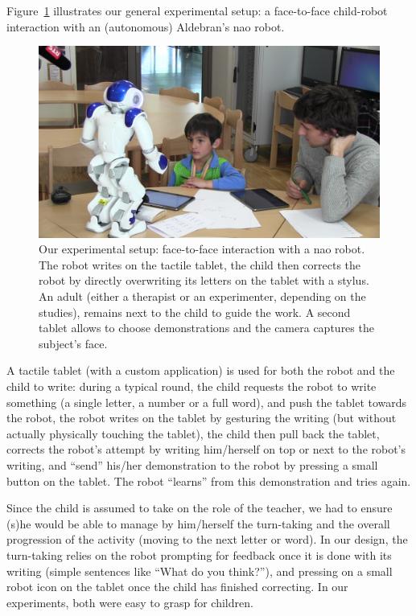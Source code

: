 \documentclass{sig-alternate}
\begin{document}
Figure~\ref{fig:realSetup} illustrates our general experimental setup: a
face-to-face child-robot interaction with an (autonomous) Aldebran's {\sc nao}
robot.

\begin{figure}[h!]
    \centering
    \includegraphics[width=1\columnwidth]{realSetup}
    \caption{\small Our experimental setup: face-to-face interaction with a {\sc
            nao} robot.  The robot writes on the tactile tablet, the child then
            corrects the robot by directly overwriting its letters on the tablet
            with a stylus. An adult (either a therapist or an experimenter,
            depending on the studies), remains next to the child to guide the work. 
            A second tablet allows to choose demonstrations and the camera captures the subject's face.}
    \label{fig:realSetup}
\end{figure}

A tactile tablet (with a custom application) is used for both the robot and the
child to write: during a typical round, the child requests the robot to write
something (a single letter, a number or a full word), and push the tablet
towards the robot, the robot writes on the tablet by gesturing the writing (but
without actually physically touching the tablet), the child then pull back the
tablet, corrects the robot's attempt by writing him/herself on top or next to
the robot's writing, and ``send'' his/her demonstration to the robot by pressing
a small button on the tablet. The robot ``learns'' from this demonstration and
tries again.

Since the child is assumed to take on the role of the teacher, we had to ensure
(s)he would be able to manage by him/herself the turn-taking and the overall
progression of the activity (moving to the next letter or word). In our design,
the turn-taking relies on the robot prompting for feedback once it is done with
its writing (simple sentences like ``What do you think?''), and pressing on a
small robot icon on the tablet once the child has finished correcting. In our
experiments, both were easy to grasp for children.
\end{document}
